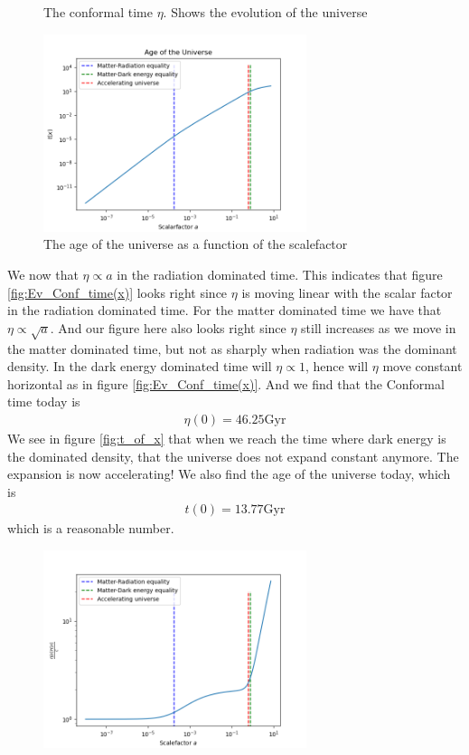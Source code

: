 \documentclass{article}
\begin{document}
\begin{multicols}{2}
\begin{figure}[H]
	\caption{The conformal time $\eta$. Shows the evolution of the universe}
	\label{fig:Ev_Conf_time(x)}
\end{figure}
\begin{figure}[H]
	\centering
	\includegraphics[width=77mm]{t_of_x.png}
	\caption{The age of the universe as a function of the scalefactor}
	\label{fig:t_of_x}
\end{figure}
We now that $\eta \propto a$ in the radiation dominated time. This indicates that figure \eqref{fig:Ev_Conf_time(x)} looks right since $\eta$ is moving linear with the scalar factor in the radiation dominated time. For the matter dominated time we have that $\eta\propto \sqrt{a}$. And our figure here also looks right since $\eta$ still increases as we move in the matter dominated time, but not as sharply when radiation was the dominant density. In the dark energy dominated time will $\eta \propto 1$, hence will $\eta$ move constant horizontal as in figure \eqref{fig:Ev_Conf_time(x)}. And we find that the Conformal time today is 
\begin{align}
    \eta(0)=46.25\text{Gyr}
\end{align}
We see in figure \eqref{fig:t_of_x} that when we reach the time where  dark energy is the dominated density, that the universe does not expand constant anymore. The expansion is now accelerating! We also find the age of the universe today, which is
\begin{align}
    t(0)=13.77 \text{Gyr}
\end{align}
which is a reasonable number.
\begin{figure}[H]
	\centering
	\includegraphics[width=77mm]{eta_Hp_c.png}

\end{figure}
\end{multicols}
\end{document}
